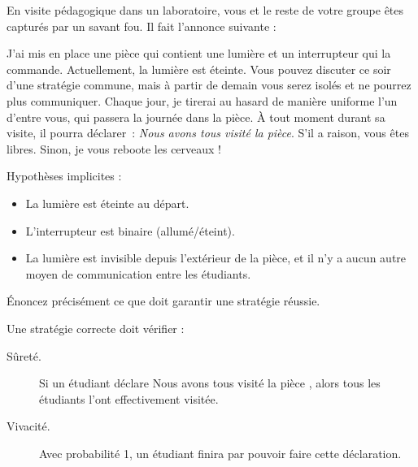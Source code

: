 
\begingroup

\begin{exercice}
  \label{exo:introduction/mad_scientist}

  En visite pédagogique dans un laboratoire, vous et le reste de votre groupe êtes 
  capturés par un savant fou. Il fait l'annonce suivante :

  \og
  J'ai mis en place une pièce qui contient une lumière et un interrupteur
  qui la commande. Actuellement, la lumière est éteinte.
  Vous pouvez discuter ce soir d'une stratégie commune, mais à partir de demain
  vous serez isolés et ne pourrez plus communiquer.
  Chaque jour, je tirerai au hasard de manière uniforme l'un d'entre vous, qui passera la journée dans la pièce.
  À tout moment durant sa visite, il pourra déclarer~: \emph{Nous avons tous visité la pièce}.
  S'il a raison, vous êtes libres. Sinon, je vous reboote les cerveaux !
  \fg

  Hypothèses implicites :
  \begin{itemize}
  \item La lumière est éteinte au départ.
  \item L'interrupteur est binaire (allumé/éteint).
  \item La lumière est invisible depuis l'extérieur de la pièce,
    et il n'y a aucun autre moyen de communication entre les étudiants.
  \end{itemize}
  
  \begin{question}
  \item Énoncez précisément ce que doit garantir une stratégie réussie.
  \end{question}
  \begin{correction}
    Une stratégie correcte doit vérifier :
    \begin{description}
    \item[Sûreté.] Si un étudiant déclare \og Nous avons tous visité la pièce \fg,
      alors tous les étudiants l'ont effectivement visitée.
    \item[Vivacité.] Avec probabilité 1, un étudiant finira par pouvoir faire cette déclaration.
    \end{description}
  \end{correction}
  

\end{exercice}
